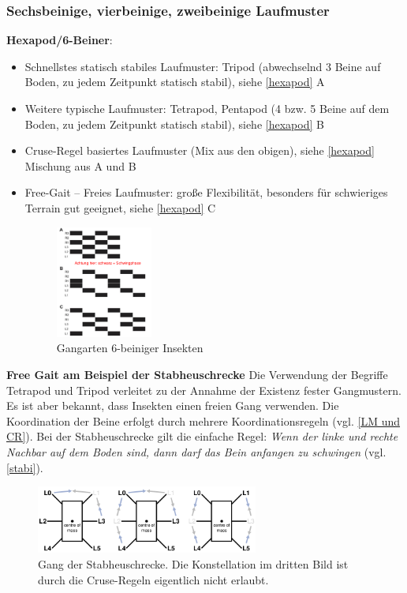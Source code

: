 \subsubsection{Sechsbeinige, vierbeinige, zweibeinige Laufmuster}
\textbf{Hexapod/6-Beiner}:
\begin{itemize}
\item Schnellstes statisch stabiles Laufmuster: Tripod (abwechselnd 3 Beine auf Boden, zu jedem Zeitpunkt statisch stabil), siehe \autoref{hexapod} A
\item Weitere typische Laufmuster: Tetrapod, Pentapod (4 bzw. 5 Beine auf dem Boden, zu jedem Zeitpunkt statisch stabil), siehe \autoref{hexapod} B
\item Cruse-Regel basiertes Laufmuster (Mix aus den obigen), siehe \autoref{hexapod} Mischung aus A und B
\item Free-Gait -- \glqq Freies Laufmuster\grqq{}: große Flexibilität, besonders für schwieriges Terrain gut geeignet, siehe \autoref{hexapod} C
\begin{figure}[h!]
	\centering
	\includegraphics[width=0.3\textwidth]{figures/ch06_hexapod.png}
	\caption{Gangarten 6-beiniger Insekten}
	\label{hexapod}
\end{figure}
\end{itemize}
\textbf{Free Gait am Beispiel der Stabheuschrecke}
Die Verwendung der Begriffe Tetrapod und Tripod verleitet zu der Annahme der Existenz fester Gangmustern.
Es ist aber bekannt, dass Insekten einen freien Gang verwenden. Die Koordination der Beine erfolgt durch mehrere Koordinationsregeln (vgl. \autoref{LM und CR}). Bei der Stabheuschrecke 
gilt die einfache Regel: \textit{Wenn der linke und rechte Nachbar auf dem Boden sind, dann darf das Bein anfangen zu schwingen} (vgl. \autoref{stabi}). 
\begin{figure}[h!]
	\centering
	\includegraphics[width=0.65\textwidth]{figures/ch06_stabi.png}
	\caption{Gang der Stabheuschrecke. Die Konstellation im dritten Bild ist durch die Cruse-Regeln eigentlich nicht erlaubt.}
	\label{stabi}
\end{figure}
